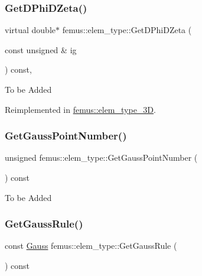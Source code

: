 \mbox{\label{classfemus_1_1elem__type_aa507628a4383a9687c8fdefe30d0214a}} 
\subsubsection{\texorpdfstring{Get\+D\+Phi\+D\+Zeta()}{GetDPhiDZeta()}}
{\footnotesize\ttfamily virtual double$\ast$ femus\+::elem\+\_\+type\+::\+Get\+D\+Phi\+D\+Zeta (\begin{DoxyParamCaption}\item[{const unsigned \&}]{ig }\end{DoxyParamCaption}) const\hspace{0.3cm}{\ttfamily [inline]}, {\ttfamily [virtual]}}

To be Added 

Reimplemented in \mbox{\hyperlink{classfemus_1_1elem__type__3_d_a8bf7020e0c07cf44c9532f9b6bab4bbc}{femus\+::elem\+\_\+type\+\_\+3D}}.

\mbox{\label{classfemus_1_1elem__type_a3fa8f889f9ae97586b3db574acb4448e}} 
\subsubsection{\texorpdfstring{Get\+Gauss\+Point\+Number()}{GetGaussPointNumber()}}
{\footnotesize\ttfamily unsigned femus\+::elem\+\_\+type\+::\+Get\+Gauss\+Point\+Number (\begin{DoxyParamCaption}{ }\end{DoxyParamCaption}) const\hspace{0.3cm}{\ttfamily [inline]}}

To be Added \mbox{\label{classfemus_1_1elem__type_a830387ca17a267d99a8ec97fa0548fc3}} 
\subsubsection{\texorpdfstring{Get\+Gauss\+Rule()}{GetGaussRule()}}
{\footnotesize\ttfamily const \mbox{\hyperlink{classfemus_1_1_gauss}{Gauss}} femus\+::elem\+\_\+type\+::\+Get\+Gauss\+Rule (\begin{DoxyParamCaption}{ }\end{DoxyParamCaption}) const\hspace{0.3cm}{\ttfamily [inline]}}

